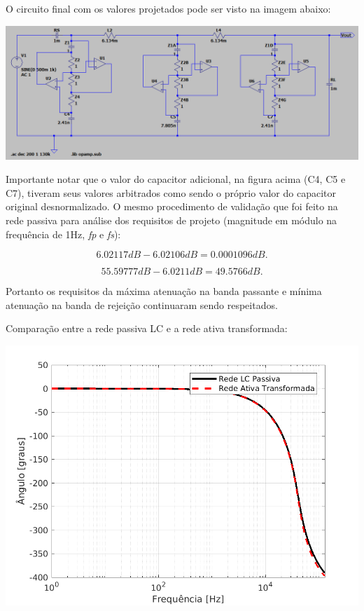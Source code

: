 \documentclass{article}
\begin{document}
O circuito final com os valores projetados pode ser visto na imagem abaixo:
\begin{center}
\centering
  \includegraphics[scale=0.5]{img/passivoativo.png}
\end{center}

Importante notar que o valor do capacitor adicional, na figura acima (C4, C5 e C7), tiveram seus valores arbitrados como sendo o próprio valor do capacitor original desnormalizado. O mesmo procedimento de validação que foi feito na rede passiva para análise dos requisitos de projeto (magnitude em módulo na frequência de 1Hz, \textit{fp} e \textit{fs}):

\begin{equation}
    6.02117dB - 6.02106dB = 0.0001096dB.
\end{equation}

\begin{equation}
    55.59777dB - 6.0211dB = 49.5766dB.
\end{equation}

Portanto os requisitos da máxima atenuação na banda passante e mínima atenuação na banda de rejeição continuaram sendo respeitados. 


Comparação entre a rede passiva LC e a rede ativa transformada:
\begin{center}
\centering
  \includegraphics[scale=0.7]{img/phase.png}
\end{center}
\end{document}
